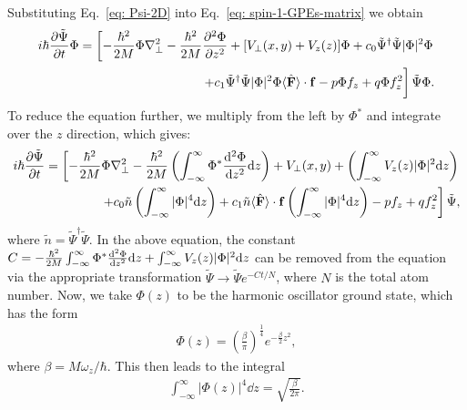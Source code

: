 Substituting Eq.~\eqref{eq: Psi-2D} into Eq.~\eqref{eq: spin-1-GPEs-matrix} we
obtain
\begin{equation}
\begin{split}
    i\hbar\pdv{\tilde{\Psi}}{t}\Phi = \left[
        -\frac{\hbar^2}{2M}\Phi\nabla_\perp^2
        - \frac{\hbar^2}{2M}\pdv[2]{\Phi}{z} + [V_\perp(x, y) + V_z(z)]\Phi
        +c_0\tilde{\Psi}^\dagger\tilde{\Psi}|\Phi|^2\Phi\right. \\
        \left.+c_1\tilde{\Psi}^\dagger\tilde{\Psi}|\Phi|^2\Phi
        \langle\hat{\vb{F}}\rangle \cdot \vb{f}
        -p\Phi f_z
        + q\Phi f_z^2
        \vphantom{\int_1^2}\right]\tilde{\Psi}\Phi.
\end{split}
\end{equation}
To reduce the equation further, we multiply from the left by \(\Phi^*\) and
integrate over the \(z\) direction, which gives:
\begin{equation}\label{eq: spin-1-GPEs-tildes}
\begin{split}
    i\hbar\pdv{\tilde{\Psi}}{t} = \left[
        -\frac{\hbar^2}{2M}\Phi\nabla_\perp^2
        - \frac{\hbar^2}{2M}\left(\int_{-\infty}^{\infty}\Phi^*\dv[2]{\Phi}{z}
        \dd z\right)
        + V_\perp(x, y) + \left(\int_{-\infty}^{\infty} V_z(z)|\Phi|^2
        \dd z\right)\right. \\
        \left.+c_0\tilde{n}\left(\int_{-\infty}^{\infty}|\Phi|^4 \dd z\right)
        +c_1\tilde{n}\langle\hat{\vb{F}}\rangle \cdot \vb{f}
        \left(\int_{-\infty}^{\infty}|\Phi|^4 \dd z\right)
        -pf_z + qf_z^2
        \right]\tilde{\Psi},
\end{split}
\end{equation}
where \(\tilde{n}=\tilde{\Psi}^\dagger\tilde{\Psi}\).
In the above equation, the constant \(C =
-\frac{\hbar^2}{2M}\int_{-\infty}^{\infty}\Phi^*\dv[2]{\Phi}{z} \dd z
+ \int_{-\infty}^{\infty} V_z(z)|\Phi|^2 \dd z\) can be removed from the
equation via the appropriate transformation \(\tilde{\Psi} \rightarrow
\tilde{\Psi}e^{-Ct/N}\), where \(N\) is the total atom number.
Now, we take \(\Phi(z)\) to be the harmonic oscillator ground state, which has
the form
\begin{align}
    \Phi(z) =
    {\left(\frac{\beta}{\pi}\right)}^{\frac{1}{4}}e^{-\frac{\beta}{2}z^2},
\end{align}
where \(\beta = M\omega_z/\hbar \).
This then leads to the integral
\begin{align}
    \int_{-\infty}^{\infty}|\Phi(z)|^4 \dd z = \sqrt{\frac{\beta}{2\pi}}.
\end{align}
